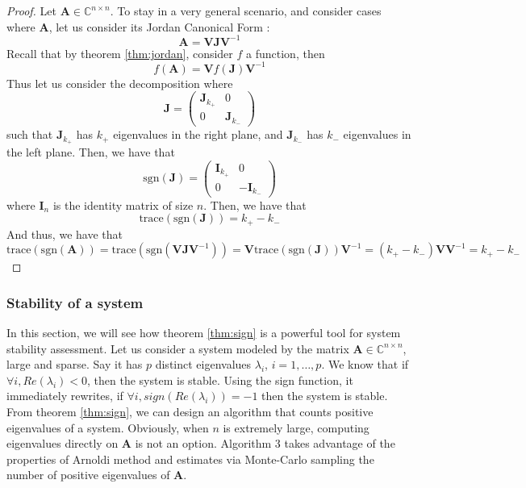 \documentclass[11pt]{article}
\numberwithin{equation}{section}
\begin{document}
\begin{proof}
    Let $\mathbf{A}\in\mathbb{C}^{n\times n}$. To stay in a very general scenario, and consider cases where $\mathbf{A}$, let us consider its Jordan Canonical Form :
    \begin{equation*}
        \mathbf{A} = \mathbf{VJV}^{-1}
    \end{equation*} 
    Recall that by theorem \ref{thm:jordan}, consider $f$ a function, then 
    \begin{equation*}
        f(\mathbf{A}) = \mathbf{V}f(\mathbf{J})\mathbf{V}^{-1}
    \end{equation*}
    Thus let us consider the decomposition where 
    \begin{equation*}
        \mathbf{J} = \begin{pmatrix}
            \mathbf{J}_{k_+} & 0 \\ 0 & \mathbf{J}_{k_-}
        \end{pmatrix}
    \end{equation*}
    such that $\mathbf{J}_{k_+}$ has $k_+$ eigenvalues in the right plane, and $\mathbf{J}_{k_-}$ has $k_-$ eigenvalues in the left plane. Then, we have that
    \begin{equation*}
        \text{sgn}(\mathbf{J}) = \begin{pmatrix}
            \mathbf{I}_{k_+} & 0 \\ 0 & -\mathbf{I}_{k_-}
        \end{pmatrix}
    \end{equation*}
    where $\mathbf{I}_n$ is the identity matrix of size $n$. Then, we have that
    \begin{equation*}
        \text{trace}(\text{sgn}(\mathbf{J})) = k_+ - k_-
    \end{equation*}
    And thus, we have that
    \begin{equation*}
        \text{trace}(\text{sgn}(\mathbf{A})) = \text{trace}(\text{sgn}(\mathbf{VJV}^{-1})) = \mathbf{V}\text{trace}(\text{sgn}(\mathbf{J}))\mathbf{V}^{-1} = (k_+-k_-)\mathbf{V}\mathbf{V}^{-1} = k_+ - k_-
    \end{equation*}
\end{proof}
\subsubsection{Stability of a system}
In this section, we will see how theorem \ref{thm:sign} is a powerful tool for system stability assessment. Let us consider a system modeled by the matrix $\mathbf{A}\in\mathbb{C}^{n\times n}$, large and sparse. Say it has $p$ distinct eigenvalues $\lambda_i$, $i=1,\dots,p$. We know that if $\forall i, Re(\lambda_i)<0$, then the system is stable. Using the sign function, it immediately rewrites, if $\forall i, sign(Re(\lambda_i)) = -1$ then the system is stable. From theorem \ref{thm:sign}, we can design an algorithm that counts positive eigenvalues of a system. Obviously, when $n$ is extremely large, computing eigenvalues directly on $\mathbf{A}$ is not an option. Algorithm 3 takes advantage of the properties of Arnoldi method and estimates via Monte-Carlo sampling the number of positive eigenvalues of $\mathbf{A}$.
\end{document}
